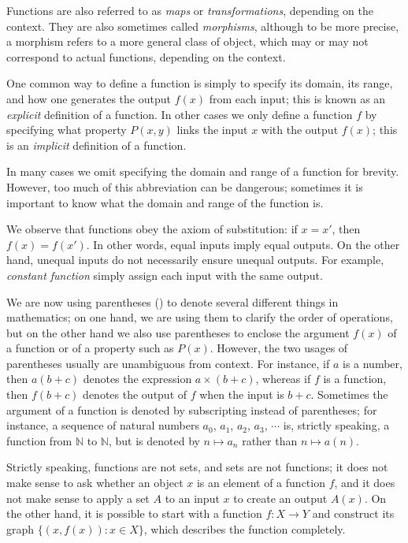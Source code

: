 Functions are also referred to as \emph{maps} or \emph{transformations}, depending on the context.
They are also sometimes called \emph{morphisms}, although to be more precise, a morphism refers to a more general class of object, which may or may not correspond to actual functions, depending on the context.

One common way to define a function is simply to specify its domain, its range, and how one generates the output \(f(x)\) from each input;
this is known as an \emph{explicit} definition of a function.
In other cases we only define a function \(f\) by specifying what property \(P(x, y)\) links the input \(x\) with the output \(f(x)\);
this is an \emph{implicit} definition of a function.

In many cases we omit specifying the domain and range of a function for brevity.
However, too much of this abbreviation can be dangerous;
sometimes it is important to know what the domain and range of the function is.

We observe that functions obey the axiom of substitution: if \(x = x'\), then \(f(x) = f(x')\).
In other words, equal inputs imply equal outputs.
On the other hand, unequal inputs do not necessarily ensure unequal outputs.
For example, \emph{constant function} simply assign each input with the same output.

\begin{remark}
We are now using parentheses () to denote several different things in mathematics;
on one hand, we are using them to clarify the order of operations, but on the other hand we also use parentheses to enclose the argument \(f(x)\) of a function or of a property such as \(P(x)\).
However, the two usages of parentheses usually are unambiguous from context.
For instance, if \(a\) is a number, then \(a(b + c)\) denotes the expression \(a \times (b + c)\), whereas if \(f\) is a function, then \(f(b + c)\) denotes the output of \(f\) when the input is \(b + c\).
Sometimes the argument of a function is denoted by subscripting instead of parentheses;
for instance, a sequence of natural numbers \(a_0\), \(a_1\), \(a_2\), \(a_3\), \(\cdots\) is, strictly speaking, a function from \(\mathds{N}\) to \(\mathds{N}\), but is denoted by \(n \mapsto a_n\) rather than \(n \mapsto a(n)\).
\end{remark}

\begin{remark}
Strictly speaking, functions are not sets, and sets are not functions;
it does not make sense to ask whether an object \(x\) is an element of a function \(f\), and it does not make sense to apply a set \(A\) to an input \(x\) to create an output \(A(x)\).
On the other hand, it is possible to start with a function \(f : X \to Y\) and construct its graph \(\{(x, f(x)) : x \in X\}\), which describes the function completely.
\end{remark}

